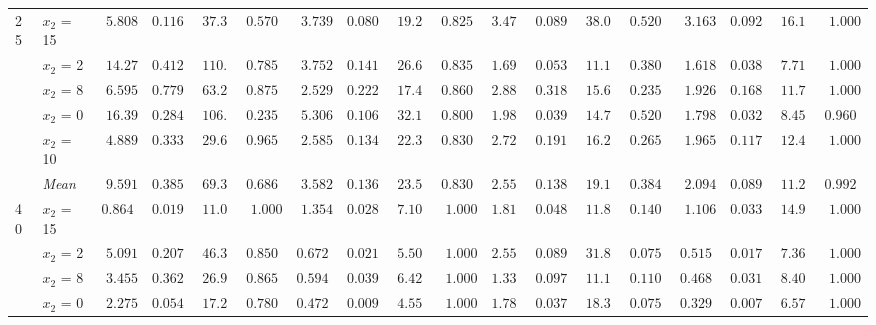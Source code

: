 \begin{table}[htbp]
\begin{tabular}{llrrrrrrrrrrrrrrrr}
\midrule
\multirow{6}{*}{25} & $x_2$ = 15 & $5.808$ & $0.1166$ & $37.32$ & $0.5700$ & $3.739$ & {\boldmath$0.0807$} & $19.29$ & {\boldmath$0.8250$} & $3.470$ & $0.0899$ & $38.02$ & $0.5200$ & {\boldmath$3.163$} & $0.0926$ & {\boldmath$16.13$} & $1.000$ \\
 & $x_2$ = 2 & $14.27$ & $0.4126$ & $110.1$ & $0.7850$ & $3.752$ & $0.1410$ & $26.61$ & {\boldmath$0.8350$} & $1.699$ & $0.0535$ & $11.19$ & $0.3800$ & {\boldmath$1.618$} & {\boldmath$0.0382$} & {\boldmath$7.714$} & $1.000$ \\
 & $x_2$ = 8 & $6.595$ & $0.7796$ & $63.28$ & {\boldmath$0.8750$} & $2.529$ & $0.2223$ & $17.48$ & $0.8600$ & $2.885$ & $0.3188$ & $15.69$ & $0.2350$ & {\boldmath$1.926$} & {\boldmath$0.1685$} & {\boldmath$11.72$} & $1.000$ \\
 & $x_2$ = 0 & $16.39$ & $0.2843$ & $106.3$ & $0.2350$ & $5.306$ & $0.1063$ & $32.14$ & $0.8000$ & $1.983$ & $0.0392$ & $14.76$ & $0.5200$ & {\boldmath$1.798$} & {\boldmath$0.0326$} & {\boldmath$8.456$} & {\boldmath$0.9600$} \\
 & $x_2$ = 10 & $4.889$ & $0.3331$ & $29.63$ & {\boldmath$0.9650$} & $2.585$ & $0.1341$ & $22.33$ & $0.8300$ & $2.729$ & $0.1911$ & $16.25$ & $0.2650$ & {\boldmath$1.965$} & {\boldmath$0.1176$} & {\boldmath$12.41$} & $1.000$ \\
 & \textit{Mean} & $9.591$ & $0.3852$ & $69.31$ & $0.6860$ & $3.582$ & $0.1369$ & $23.57$ & \colorbox{green!20}{\boldmath$0.8300$} & $2.553$ & $0.1385$ & $19.18$ & $0.3840$ & \colorbox{green!20}{\boldmath$2.094$} & \colorbox{green!20}{\boldmath$0.0899$} & \colorbox{green!20}{\boldmath$11.29$} & $0.9920$ \\
\midrule
\multirow{6}{*}{40} & $x_2$ = 15 & {\boldmath$0.8645$} & {\boldmath$0.0198$} & $11.03$ & {\boldmath$1.000$} & $1.354$ & $0.0280$ & {\boldmath$7.102$} & $1.000$ & $1.818$ & $0.0483$ & $11.82$ & $0.1400$ & $1.106$ & $0.0334$ & $14.98$ & $1.000$ \\
 & $x_2$ = 2 & $5.091$ & $0.2073$ & $46.32$ & {\boldmath$0.8500$} & $0.6727$ & $0.0216$ & {\boldmath$5.507$} & $1.000$ & $2.552$ & $0.0898$ & $31.84$ & $0.0750$ & {\boldmath$0.5152$} & {\boldmath$0.0170$} & $7.361$ & $1.000$ \\
 & $x_2$ = 8 & $3.455$ & $0.3626$ & $26.91$ & {\boldmath$0.8650$} & $0.5942$ & $0.0390$ & {\boldmath$6.420$} & $1.000$ & $1.336$ & $0.0973$ & $11.16$ & $0.1100$ & {\boldmath$0.4684$} & {\boldmath$0.0312$} & $8.407$ & $1.000$ \\
 & $x_2$ = 0 & $2.275$ & $0.0544$ & $17.26$ & $0.7800$ & $0.4726$ & $0.0092$ & {\boldmath$4.558$} & {\boldmath$1.000$} & $1.788$ & $0.0379$ & $18.36$ & $0.0750$ & {\boldmath$0.3295$} & {\boldmath$0.0074$} & $6.572$ & $1.000$ \\

\end{tabular}
\end{table}
